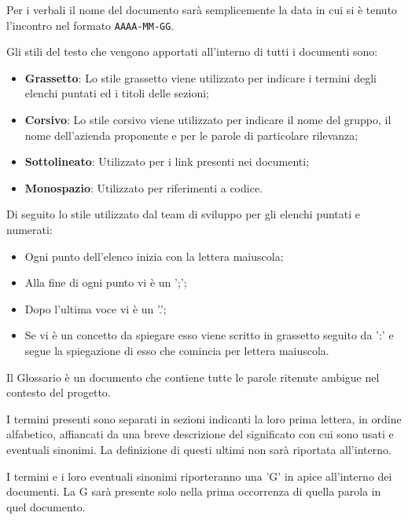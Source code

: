     Per i verbali il nome del documento sarà semplicemente la data in cui si è tenuto l'incontro nel formato \texttt{AAAA-MM-GG}.


    Gli stili del testo che vengono apportati all’interno di tutti i documenti sono:

\begin{itemize}
\item \textbf{Grassetto}: Lo stile grassetto viene utilizzato per indicare i termini degli elenchi puntati ed i titoli delle sezioni;
\item \textbf{Corsivo}: Lo stile corsivo viene utilizzato per indicare il nome del gruppo, il nome dell'azienda proponente e per le parole di particolare rilevanza;
\item \textbf{Sottolineato}: Utilizzato per i link presenti nei documenti;
\item \textbf{Monospazio}: Utilizzato per riferimenti a codice.
\end{itemize}

    \pagebreak


    Di seguito lo stile utilizzato dal team di sviluppo per gli elenchi puntati e numerati:

\begin{itemize}
\item Ogni punto dell'elenco inizia con la lettera maiuscola;
\item Alla fine di ogni punto vi è un ';';
\item Dopo l'ultima voce vi è un '.';
\item Se vi è un concetto da spiegare esso viene scritto in grassetto seguito da ':' e segue la spiegazione di esso che comincia per lettera maiuscola.
\end{itemize}

    Il Glossario è un documento che contiene tutte le parole ritenute ambigue nel contesto del progetto.

    I termini presenti sono separati in sezioni indicanti la loro prima lettera, in ordine alfabetico, affiancati
    da una breve descrizione del significato con cui sono usati e eventuali sinonimi.
    La definizione di questi ultimi non sarà riportata all'interno.

    I termini e i loro eventuali sinonimi riporteranno una 'G' in apice all'interno dei documenti. La G sarà
    presente solo nella prima occorrenza di quella parola in quel documento.

